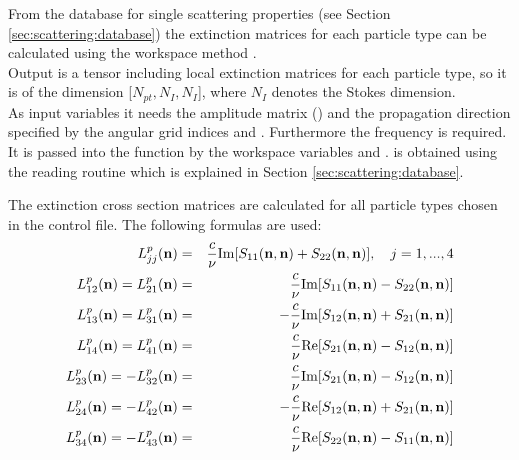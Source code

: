 From the database for single scattering properties (see Section
\ref{sec:scattering:database}) the extinction matrices for each
particle type can be calculated using the workspace method
.\\
Output is a tensor including local extinction matrices for each
particle type, so it is of the dimension [$N_{pt}, N_{I}, N_{I}$],
where $N_{I}$ denotes the Stokes dimension.\\
As input variables it needs the amplitude matrix ()
and the propagation direction specified by the angular grid indices
 and . Furthermore
the frequency is required. It is passed into the function by the
workspace variables  and .
 is obtained using the reading routine
 which is explained in Section
\ref{sec:scattering:database}.


The extinction cross section matrices \SExMat{} are calculated for all
particle types chosen in the control file. The following formulas are
used:
\begin{eqnarray}
  \label{eq:gen_ext_matrix}
  L^p_{jj}({\bf n}) &=& \frac{c}{\nu} \Im[S_{11}({\bf n},{\bf
    n})+S_{22}({\bf n},{\bf n})], \quad j=1,...,4 \\
  L^p_{12}({\bf n}) = L^p_{21}({\bf n}) &=& \frac{c}{\nu} \Im[S_{11}({\bf n},{\bf
    n})-S_{22}({\bf n},{\bf n})]\\
  L^p_{13}({\bf n}) = L^p_{31}({\bf n}) &=& -\frac{c}{\nu} \Im[S_{12}({\bf n},{\bf
    n})+S_{21}({\bf n},{\bf n})]\\
  L^p_{14}({\bf n}) = L^p_{41}({\bf n}) &=& \frac{c}{\nu} \Re[S_{21}({\bf n},{\bf
    n})-S_{12}({\bf n},{\bf n})]\\
  L^p_{23}({\bf n}) = -L^p_{32}({\bf n}) &=& \frac{c}{\nu} \Im[S_{21}({\bf n},{\bf
    n})-S_{12}({\bf n},{\bf n})]\\
  L^p_{24}({\bf n}) = -L^p_{42}({\bf n}) &=& -\frac{c}{\nu} \Re[S_{12}({\bf n},{\bf
    n})+S_{21}({\bf n},{\bf n})]\\
  L^p_{34}({\bf n}) = -L^p_{43}({\bf n}) &=& \frac{c}{\nu} \Re[S_{22}({\bf n},{\bf
    n})-S_{11}({\bf n},{\bf n})]
\end{eqnarray}


\label{sec:scattering:abs_vec_spt}

